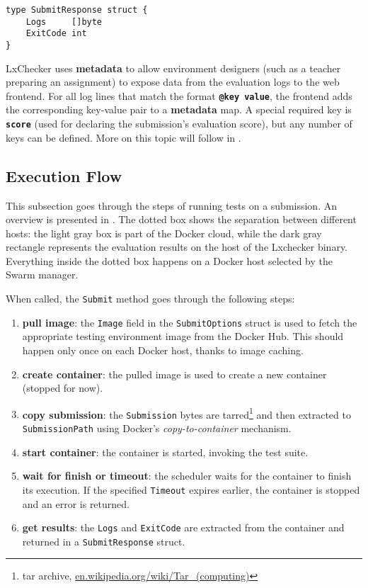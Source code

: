 \begin{lstlisting}
type SubmitResponse struct {
	Logs     []byte
	ExitCode int
}
\end{lstlisting}

LxChecker uses \textbf{metadata} to allow environment designers (such as a teacher preparing an assignment) to expose data from the evaluation logs to the web frontend. For all log lines that match the format \textbf{\texttt{@key value}}, the frontend adds the corresponding key-value pair to a \textbf{metadata} map. A special required key is \textbf{\texttt{score}} (used for declaring the submission's evaluation score), but any number of keys can be defined. More on this topic will follow in .

\subsection{Execution Flow}
\label{sub-sec:scheduler-execution}

This subsection goes through the steps of running tests on a submission. An overview is presented in . The dotted box shows the separation between different hosts: the light gray box is part of the Docker cloud, while the dark gray rectangle represents the evaluation results on the host of the Lxchecker binary. Everything inside the dotted box happens on a Docker host selected by the Swarm manager.


When called, the \texttt{Submit} method goes through the following steps:
\begin{enumerate}
	\item \textbf{pull image}: the \texttt{Image} field in the \texttt{SubmitOptions} struct is used to fetch the appropriate testing environment image from the Docker Hub. This should happen only once on each Docker host, thanks to image caching.
	\item \textbf{create container}: the pulled image is used to create a new container (stopped for now).
	\item \textbf{copy submission}: the \texttt{Submission} bytes are tarred\footnote{tar archive, \url{en.wikipedia.org/wiki/Tar_(computing)}} and then extracted to \texttt{SubmissionPath} using Docker's \textit{copy-to-container} mechanism.
	\item \textbf{start container}: the container is started, invoking the test suite.
	\item \textbf{wait for finish or timeout}: the scheduler waits for the container to finish its execution. If the specified \texttt{Timeout} expires earlier, the container is stopped and an error is returned.
	\item \textbf{get results}: the \texttt{Logs} and \texttt{ExitCode} are extracted from the container and returned in a \texttt{SubmitResponse} struct.
\end{enumerate}


